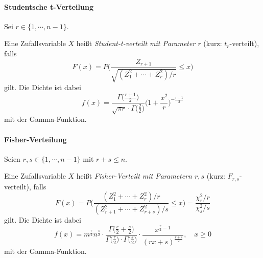                 \paragraph{Studentsche t-Verteilung}
                    Sei \( r \in \{ 1, \cdots, n - 1 \} \).
                    
                    Eine Zufallsvariable \(X\) heißt \textit{Student-t-verteilt mit Parameter \(r\)} (kurz: \( t_r \)-verteilt), falls
                    \begin{equation*}
                        F(x) = P\Bigg( \frac{Z_{r+1}}{\sqrt{(Z_1^2 + \cdots + Z_r^2) / r}} \leq x \Bigg)
                    \end{equation*}
                    gilt. Die Dichte ist dabei
                    \begin{equation*}
                        f(x) = \frac{\Gamma\big(\frac{r + 1}{2}\big)}{\sqrt{\pi r} \cdot \Gamma\big(\frac{2}{2}\big)} \Bigg(1 + \frac{x^2}{r}\Bigg) ^ { -\frac{r+1}{2} }
                    \end{equation*}
                    mit der Gamma-Funktion.

                \paragraph{Fisher-Verteilung}
                    Seien \( r, s \in \{ 1, \cdots, n - 1 \} \) mit \( r + s \leq n \).
                    
                    Eine Zufallsvariable \(X\) heißt \textit{Fisher-Verteilt mit Parametern \( r, s \)} (kurz: \(F_{r,s}\)-verteilt), falls
                    \begin{equation*}
                        F(x) = P\Bigg( \frac{(Z_1^2 + \cdots + Z_r^2) / r}{(Z_{r+1}^2 + \cdots + Z_{r+s}^2) / s} \leq x \Bigg) = \frac{\chi_r^2 / r}{\chi_s^2 / s}
                    \end{equation*}
                    gilt. Die Dichte ist dabei
                    \begin{equation*}
                        f(x) = m^{\frac{r}{2}} n^{\frac{s}{2}} \cdot \frac{\Gamma\big( \frac{r}{2} + \frac{s}{2} \big)}{\Gamma\big( \frac{r}{2} \big) \cdot \Gamma\big( \frac{s}{2} \big)} \cdot \frac{x^{ \frac{r}{2} - 1 }}{(rx + s)^{\frac{r + s}{2}}}, \quad x \geq 0
                    \end{equation*}
                    mit der Gamma-Funktion.

